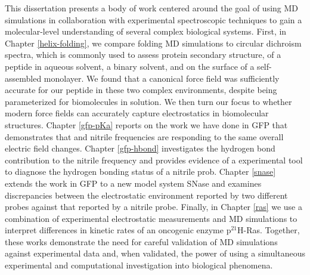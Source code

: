 This dissertation presents a body of work centered around the goal of using MD simulations in collaboration with experimental spectroscopic techniques to gain a molecular-level understanding of several complex biological systems. 
First, in Chapter \ref{helix-folding}, we compare folding MD simulations to circular dichroism spectra, which is commonly used to assess protein secondary structure, of a peptide in aqueous solvent, a binary solvent, and on the surface of a self-assembled monolayer. 
We found that a canonical force field was sufficiently accurate for our peptide in these two complex environments, despite being parameterized for biomolecules in solution. 
We then turn our focus to whether modern force fields can accurately capture electrostatics in biomolecular structures. 
Chapter \ref{gfp-pKa} reports on the work we have done in GFP that demonstrates that \pKa{} and nitrile frequencies are responding to the same overall electric field changes. 
Chapter \ref{gfp-hbond} investigates the hydrogen bond contribution to the nitrile frequency and provides evidence of a experimental tool to diagnose the hydrogen bonding status of a nitrile prob. 
Chapter \ref{snase} extends the work in GFP to a new model system SNase and examines discrepancies between the electrostatic environment reported by two different \pKa{} probes against that reported by a nitrile probe. 
Finally, in Chapter \ref{ras} we use a combination of experimental electrostatic measurements and MD simulations to interpret differences in kinetic rates of an oncogenic enzyme p$^{21}$H-Ras. 
Together, these works demonstrate the need for careful validation of MD simulations against experimental data and, when validated, the power of using a simultaneous experimental and computational investigation into biological phenomena.

